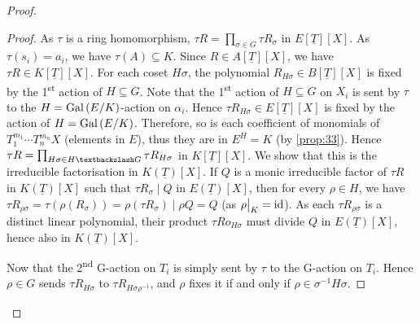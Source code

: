 \begin{proof}
\begin{proof}
  As $\tau$ is a ring homomorphism, $\tau{}R = \prod_{\sigma \in G} \tau{}R_\sigma$ in $E[\underline{T}][X]$. As $\tau(s_i) = a_i$, we have $\tau(A) \subseteq K$. Since $R \in A[\underline{T}][X]$, we have $\tau{}R \in K[\underline{T}][X]$. For each coset $H\sigma$, the polynomial $R_{H\sigma} \in B[\underline{T}][X]$ is fixed by the 1\textsuperscript{st} action of $H \subseteq G$. Note that the 1\textsuperscript{st} action of $H \subseteq G$ on $X_i$ is sent by $\tau$ to the $H = \operatorname{Gal}\left(E/K\right)$-action on $\alpha_i$. Hence $\tau{}R_{H\sigma} \in E[\underline{T}][X]$ is fixed by the action of $H = \operatorname{Gal}\left(E/K\right)$. Therefore, so is each coefficient of monomials of $T_1^{m_1}\cdots{}T_n^{m_n}X$ (elements in $E$), thus they are in $E^H = K$ (by \autoref{prop:33}). Hence $\tau{}R = \prod_{H\sigma \in H \textbackslash G}\tau{}R_{H\sigma}$ in $K[\underline{T}][X]$. We show that this is the irreducible factorisation in $K(\underline{T})[X]$. If $Q$ is a monic irreducible factor of $\tau{}R$ in $K(\underline{T})[X]$ such that $\tau{}R_{\sigma} \mid Q$ in $E(\underline{T})[X]$,  then for every $\rho \in H$, we have $\tau{}R_{\rho\sigma} = \tau(\rho(R_\sigma)) = \rho(\tau{}R_\sigma) \mid \rho{}Q = Q$ (as $\restr{\rho}{K} = \text{id}$). As each $\tau{}R_{\rho\sigma}$ is a distinct linear polynomial, their product $\tau{}Ro_{H\sigma}$ must divide $Q$ in $E(\underline{T})[X]$, hence also in $K(\underline{T})[X]$.

Now that the 2\textsuperscript{nd} G-action on $T_i$ is simply sent by $\tau$ to the G-action on $T_i$. Hence $\rho \in G$ sends $\tau{}R_{H\sigma}$ to $\tau{}R_{H\sigma\rho^{-1}}$, and $\rho$ fixes it if and only if $\rho \in \sigma^{-1}H\sigma$.
\end{proof}


\end{proof}
